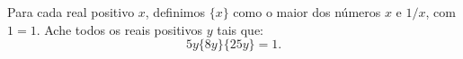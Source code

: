 Para cada real positivo $x$, definimos $\{x\}$ como o maior dos números $x$ e $1/x$, com ${1} = 1$. Ache todos os reais positivos $y$ tais que:
$$5y\{8y\}\{25y\}= 1.$$